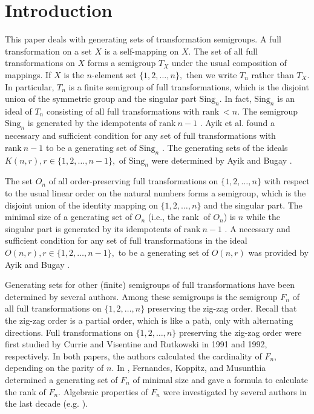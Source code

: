 \documentclass[11pt]{article}
\theoremstyle{plain}
\theoremstyle{definition}
\newcommand{\rank}{\mathrm{rank~}}
\newcommand{\Sing}{\mathrm{Sing}}%
\begin{document}
\section{Introduction}
This paper deals with generating sets of transformation semigroups. A full transformation on a set $X$ is a self-mapping on $X.$ The set of all full transformations on $X$ forms a semigroup $T_{X}$ under the usual composition of mappings. If $X$ is the $n$-element set $\{1,2,\ldots,n\},$ then we write $T_{n}$ rather than $T_{X}.$ In particular, $T_{n}$ is a finite semigroup of full transformations, which is the disjoint union of the symmetric group and the singular part $\Sing_{n}.$ In fact, $\Sing_{n}$ is an ideal of $T_{n}$ consisting of all full transformations with $\rank<n.$ The semigroup $\Sing_{n}$ is generated by the idempotents of $\rank n-1$ \cite{A}. Ayik et al. found a necessary and sufficient condition for any set of full transformations with $\rank n-1$ to be a generating set of $\Sing_{n}$ \cite{B}. The generating sets of the ideals  $K(n,r),r\in\{1,2,\ldots,n-1\},$ of $\Sing_{n}$ were determined by Ayik and Bugay \cite{C}. 

The set $O_{n}$ of all order-preserving full transformations on $\{1,2,\ldots,n\}$ with respect to the usual linear order on the natural numbers forms a semigroup, which is the disjoint union of the identity mapping on $\{1,2,\ldots,n\}$ and the singular part. The minimal size of a generating set of $O_{n}$ (i.e., the $\rank$ of $O_{n}$) is $n$ while the singular part is generated by its idempotents of $\rank n-1$ \cite{D}. A necessary and sufficient condition for any set of full transformations in the ideal $O(n,r), r\in\{1,2,\ldots,n-1\},$ to be a generating set of $O(n,r)$ was provided by Ayik and Bugay \cite{E}.
 
Generating sets for other (finite) semigroups of full transformations have been determined by several authors. Among these semigroups is the semigroup $F_{n}$ of all full transformations on $\{1,2,\ldots,n\}$ preserving the zig-zag order. Recall that the zig-zag order is a partial order, which is like a path, only with alternating directions. Full transformations on $\{1,2,\ldots,n\}$ preserving the zig-zag order were first studied by Currie and Visentine \cite{3} and Rutkowski \cite{16} in 1991 and 1992, respectively. In both papers, the authors calculated the cardinality of $F_{n},$ depending on the parity of $n.$ In \cite{F}, Fernandes, Koppitz, and Musunthia determined a generating set of $F_{n}$ of minimal size and gave a formula to calculate the rank of $F_{n}.$ Algebraic properties of $F_{n}$ were investigated by several authors in the last decade (e.g. \cite{I,H,G}).
\end{document}
